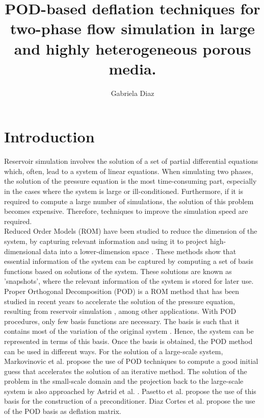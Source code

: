 \documentclass[a4paper,10pt]{article}
\title{POD-based deflation techniques for two-phase flow simulation in large and highly heterogeneous porous media.}
\author{Gabriela Diaz}
\begin{document}
\maketitle
\section*{Introduction}

\hspace{0.5cm}Reservoir simulation involves the solution of a set of partial differential equations
which, often, lead to a system of linear equations. When simulating two phases, the solution of 
the pressure equation is the most time-consuming part, especially in the cases where the system is 
large or ill-conditioned. Furthermore, if it is required to compute a large number of simulations,
the solution of this problem becomes expensive. Therefore, techniques to improve the 
simulation speed are required.\\
Reduced Order Models (ROM) have been studied to reduce the dimension of the system, by capturing 
relevant information and using it to project high-dimensional data into a lower-dimension 
space \cite{Vermeulen04,Kerschen05,Pasetto16,Schilders08,Quarteroni14,Carlberg15}. These methods 
show that essential information of the system can be captured by computing a set of basis 
functions based on solutions of the system. These solutions are known as 'snapshots', where the relevant information of the system is stored for later use.\\
Proper Orthogonal Decomposition (POD) is a ROM method that has been studied in recent years to 
accelerate the solution of the pressure equation, resulting from reservoir simulation 
\cite{Astrid11,Mark06, Mark09,Cardoso09,Heijn04,Doren06}, among other applications. 
With POD procedures, only few basis functions are necessary. The basis is such that it contains most of the variation of the original system \cite{Cardoso09,Kerschen05}. Hence, the system can be 
represented in terms of this basis. 
Once the basis is obtained, the POD method can be used in different ways. For the 
solution of a large-scale system, Markovinovic et al. \cite{Mark06} propose the use of POD techniques to compute a good 
initial guess that accelerates the solution of an iterative method. The
solution of the problem in the small-scale domain and the projection back to the large-scale system
is also approached by Astrid et al. \cite{Astrid11}. Pasetto et al. \cite{Pasetto16} propose the use of this basis for the construction of a preconditioner. Diaz Cortes et al. \cite{Diaz17} propose the use of the POD basis as deflation matrix.\\
\end{document}
